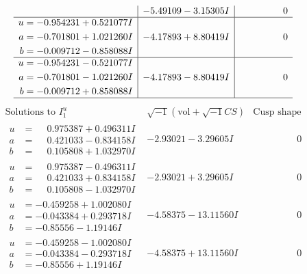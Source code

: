 \documentclass[1p]{elsarticle_modified}
\theoremstyle{definition}
\newcommand{\I}{\sqrt{-1}}
\begin{document}
$$\begin{array}{c|c|c}
 & -5.49109 - 3.15305 I & \phantom{-0.000000 } 0 \\ \hline\begin{aligned}
u &= -0.954231 + 0.521077 I \\
a &= -0.701801 + 1.021260 I \\
b &= -0.009712 - 0.858088 I\end{aligned}
 & -4.17893 + 8.80419 I & \phantom{-0.000000 } 0 \\ \hline\begin{aligned}
u &= -0.954231 - 0.521077 I \\
a &= -0.701801 - 1.021260 I \\
b &= -0.009712 + 0.858088 I\end{aligned}
 & -4.17893 - 8.80419 I & \phantom{-0.000000 } 0\\
 \hline 
 \end{array}$$\newpage$$\begin{array}{c|c|c}  
\text{Solutions to }I^u_{1}& \I (\text{vol} + \sqrt{-1}CS) & \text{Cusp shape}\\
 \hline 
\begin{aligned}
u &= \phantom{-}0.975387 + 0.496311 I \\
a &= \phantom{-}0.421033 - 0.834158 I \\
b &= \phantom{-}0.105808 + 1.032970 I\end{aligned}
 & -2.93021 - 3.29605 I & \phantom{-0.000000 } 0 \\ \hline\begin{aligned}
u &= \phantom{-}0.975387 - 0.496311 I \\
a &= \phantom{-}0.421033 + 0.834158 I \\
b &= \phantom{-}0.105808 - 1.032970 I\end{aligned}
 & -2.93021 + 3.29605 I & \phantom{-0.000000 } 0 \\ \hline\begin{aligned}
u &= -0.459258 + 1.002080 I \\
a &= -0.043384 + 0.293718 I \\
b &= -0.85556 - 1.19146 I\end{aligned}
 & -4.58375 - 13.11560 I & \phantom{-0.000000 } 0 \\ \hline\begin{aligned}
u &= -0.459258 - 1.002080 I \\
a &= -0.043384 - 0.293718 I \\
b &= -0.85556 + 1.19146 I\end{aligned}
 & -4.58375 + 13.11560 I & \phantom{-0.000000 } 0 \\ \hline\begin{aligned}

\end{aligned}
\end{array}$$
\end{document}
